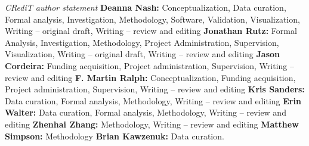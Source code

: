 \documentclass[draft]{agujournal2019}
\begin{document}

\textit{CRediT author statement} \textbf{Deanna Nash:} Conceptualization, Data curation, Formal analysis, Investigation, Methodology, Software, Validation, Visualization, Writing – original draft, Writing – review and editing \textbf{Jonathan Rutz:} Formal Analysis, Investigation, Methodology, Project Administration, Supervision, Visualization, Writing – original draft, Writing – review and editing \textbf{Jason Cordeira:} Funding acquisition, Project administration, Supervision, Writing – review and editing \textbf{F. Martin Ralph:} Conceptualization, Funding acquisition, Project administration, Supervision, Writing – review and editing \textbf{Kris Sanders:} Data curation, Formal analysis, Methodology, Writing – review and editing \textbf{Erin Walter:} Data curation, Formal analysis, Methodology, Writing – review and editing \textbf{Zhenhai Zhang:} Methodology, Writing – review and editing \textbf{Matthew Simpson:} Methodology \textbf{Brian Kawzenuk:} Data curation.



%
%





%
%
%
%
%
\end{document}
